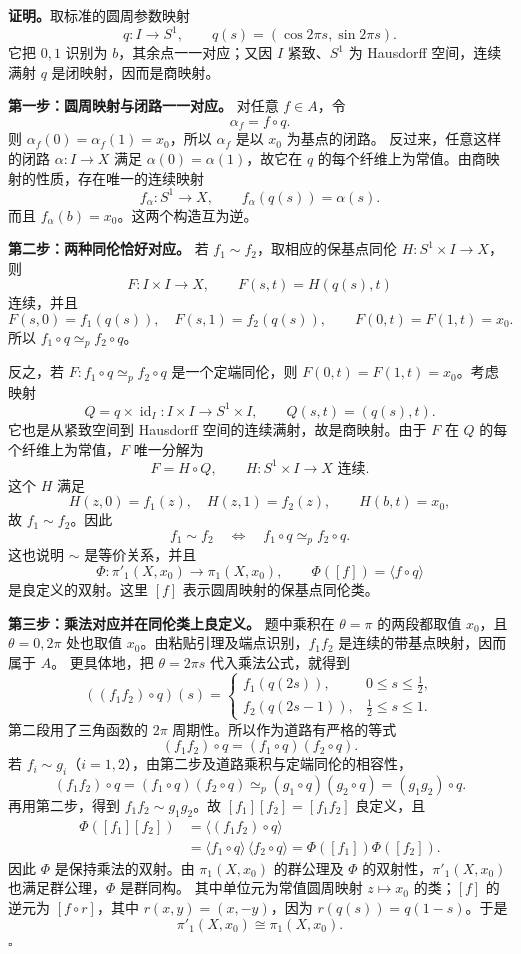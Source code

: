 \documentclass[UTF8,11pt,a4paper]{ctexart}
\newcommand{\pc}[1]{\langle #1\rangle}
\newcommand{\pe}{\simeq_p}
\newcommand{\pf}{\par\noindent\textbf{证明。}}
\newcommand{\done}{\hfill\(\square\)\par}
\begin{document}
\pf 取标准的圆周参数映射
\[
 q:I\to S^1,\qquad q(s)=(\cos2\pi s,\sin2\pi s).
\]
它把 \(0,1\) 识别为 \(b\)，其余点一一对应；又因 \(I\) 紧致、\(S^1\) 为 Hausdorff 空间，连续满射 \(q\) 是闭映射，因而是商映射。

\textbf{第一步：圆周映射与闭路一一对应。}
对任意 \(f\in A\)，令
\[
 \alpha_f=f\circ q.
\]
则 \(\alpha_f(0)=\alpha_f(1)=x_0\)，所以 \(\alpha_f\) 是以 \(x_0\) 为基点的闭路。
反过来，任意这样的闭路 \(\alpha:I\to X\) 满足 \(\alpha(0)=\alpha(1)\)，故它在 \(q\) 的每个纤维上为常值。由商映射的性质，存在唯一的连续映射
\[
 f_\alpha:S^1\to X,\qquad f_\alpha(q(s))=\alpha(s).
\]
而且 \(f_\alpha(b)=x_0\)。这两个构造互为逆。

\textbf{第二步：两种同伦恰好对应。}
若 \(f_1\sim f_2\)，取相应的保基点同伦 \(H:S^1\times I\to X\)，则
\[
 F:I\times I\to X,\qquad F(s,t)=H(q(s),t)
\]
连续，并且
\[
 F(s,0)=f_1(q(s)),\quad F(s,1)=f_2(q(s)),
 \qquad F(0,t)=F(1,t)=x_0.
\]
所以 \(f_1\circ q\pe f_2\circ q\)。

反之，若 \(F:f_1\circ q\pe f_2\circ q\) 是一个定端同伦，则
\(F(0,t)=F(1,t)=x_0\)。考虑映射
\[
 Q=q\times\operatorname{id}_I:I\times I\to S^1\times I,
 \qquad Q(s,t)=(q(s),t).
\]
它也是从紧致空间到 Hausdorff 空间的连续满射，故是商映射。由于 \(F\) 在 \(Q\) 的每个纤维上为常值，\(F\) 唯一分解为
\[
 F=H\circ Q,\qquad H:S^1\times I\to X\text{ 连续}.
\]
这个 \(H\) 满足
\[
 H(z,0)=f_1(z),\quad H(z,1)=f_2(z),
 \qquad H(b,t)=x_0,
\]
故 \(f_1\sim f_2\)。因此
\[
 f_1\sim f_2\quad\Longleftrightarrow\quad
 f_1\circ q\pe f_2\circ q.
\]
这也说明 \(\sim\) 是等价关系，并且
\[
 \Phi:\pi'_1(X,x_0)\to\pi_1(X,x_0),
 \qquad \Phi([f])=\pc{f\circ q}
\]
是良定义的双射。这里 \([f]\) 表示圆周映射的保基点同伦类。

\textbf{第三步：乘法对应并在同伦类上良定义。}
题中乘积在 \(\theta=\pi\) 的两段都取值 \(x_0\)，且 \(\theta=0,2\pi\) 处也取值 \(x_0\)。由粘贴引理及端点识别，\(f_1f_2\) 是连续的带基点映射，因而属于 \(A\)。
更具体地，把 \(\theta=2\pi s\) 代入乘法公式，就得到
\[
 ((f_1f_2)\circ q)(s)=
 \begin{cases}
 f_1(q(2s)),&0\leq s\leq\tfrac12,\\
 f_2(q(2s-1)),&\tfrac12\leq s\leq1.
 \end{cases}
\]
第二段用了三角函数的 \(2\pi\) 周期性。所以作为道路有严格的等式
\[
 (f_1f_2)\circ q=(f_1\circ q)(f_2\circ q).
\]
若 \(f_i\sim g_i\)（\(i=1,2\)），由第二步及道路乘积与定端同伦的相容性，
\[
 (f_1f_2)\circ q
 =(f_1\circ q)(f_2\circ q)
 \pe(g_1\circ q)(g_2\circ q)
 =(g_1g_2)\circ q.
\]
再用第二步，得到 \(f_1f_2\sim g_1g_2\)。故 \([f_1][f_2]=[f_1f_2]\) 良定义，且
\[
 \begin{aligned}
 \Phi([f_1][f_2])
 &=\pc{(f_1f_2)\circ q}\\
 &=\pc{f_1\circ q}\,\pc{f_2\circ q}
 =\Phi([f_1])\Phi([f_2]).
 \end{aligned}
\]
因此 \(\Phi\) 是保持乘法的双射。由 \(\pi_1(X,x_0)\) 的群公理及 \(\Phi\) 的双射性，\(\pi'_1(X,x_0)\) 也满足群公理，\(\Phi\) 是群同构。
其中单位元为常值圆周映射 \(z\mapsto x_0\) 的类；\([f]\) 的逆元为 \([f\circ r]\)，其中 \(r(x,y)=(x,-y)\)，因为 \(r(q(s))=q(1-s)\)。于是
\[
 \boxed{\pi'_1(X,x_0)\cong\pi_1(X,x_0).}
\]
\done
\end{document}
